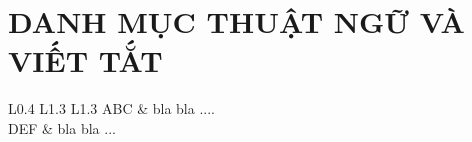 \section*{DANH MỤC THUẬT NGỮ VÀ VIẾT TẮT}
 {}

\begin{tabularx}{\textwidth}{ L{0.4} L{1.3} L{1.3} }
    ABC & bla bla .... \\
    DEF & bla bla ... \\
    \end{tabularx}

\newpage